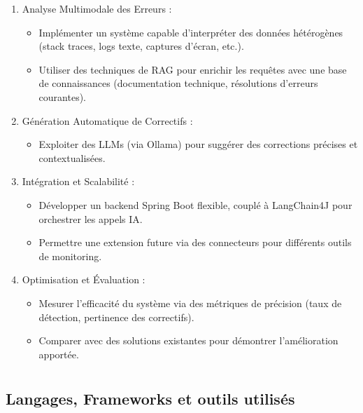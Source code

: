 \documentclass[12pt,a4paper]{report}
\begin{document}
	\begin{enumerate}
		\item Analyse Multimodale des Erreurs :
		\begin{itemize}
			\item Implémenter un système capable d’interpréter des données hétérogènes (stack traces, logs texte, captures d’écran, etc.).
			\item Utiliser des techniques de RAG pour enrichir les requêtes avec une base de connaissances (documentation technique, résolutions d’erreurs courantes).
		\end{itemize}
		
		\item Génération Automatique de Correctifs :
		\begin{itemize}
			\item Exploiter des LLMs (via Ollama) pour suggérer des corrections précises et contextualisées.
		\end{itemize}
		
		\item Intégration et Scalabilité :
		\begin{itemize}
			\item Développer un backend Spring Boot flexible, couplé à LangChain4J pour orchestrer les appels IA.
			
			\item Permettre une extension future via des connecteurs pour différents outils de monitoring.
		\end{itemize}
		
		\item Optimisation et Évaluation :
		\begin{itemize}
			\item Mesurer l’efficacité du système via des métriques de précision (taux de détection, pertinence des correctifs).
			
			\item Comparer avec des solutions existantes pour démontrer l’amélioration apportée.
		\end{itemize}
	\end{enumerate}
	
	\chapter{}

	\section{Langages, Frameworks et outils utilisés}
	
\end{document}
